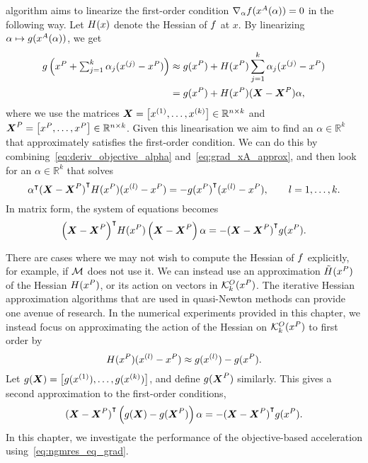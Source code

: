 \documentclass[main.tex]{subfiles}
\begin{document}
algorithm aims to linearize the first-order condition
$\nabla_\alpha f(x^A(\alpha))=0$ in the following way. Let
$H(x)$ denote the Hessian of $f$ at $x$. By linearizing
$\alpha\mapsto\nobreak g(x^A(\alpha))$, we get
\begin{align}\label{eq:grad_xA_approx}
  \begin{split}
    g\left({\textstyle
        x^P+\sum_{j=1}^k\alpha_j(x^{(j)}-x^P)}\right) &\approx
    g(x^P) + H(x^P)
    \sum_{j=1}^k\alpha_j(x^{(j)}-x^P)\\
    &= g(x^P) +H(x^P)(\boldsymbol{X}-\boldsymbol{X}^P)\alpha,
  \end{split}
\end{align}
where we use the matrices
$\boldsymbol{X} = \left[x^{(1)},\dots,x^{(k)}\right]\in\mathbb{R}^{n\times
  k}$ and
$\boldsymbol{X}^P = \left[x^P,\dots,x^P\right]\in\mathbb{R}^{n\times k}$.
Given this linearisation we aim to find an $\alpha\in\mathbb{R}^k$
that approximately satisfies the first-order
condition. %
We can do this by combining~\eqref{eq:deriv_objective_alpha}
and~\eqref{eq:grad_xA_approx}, and then look for an
$\alpha\in\mathbb{R}^k$ that solves
\begin{equation}
  \alpha^\intercal{(\boldsymbol{X}-\boldsymbol{X}^P)}^\intercal H(x^P)
  (x^{(l)}-x^P) = -{g(x^P)}^\intercal(x^{(l)}-x^P),\qquad l=1,\dots,k.
\end{equation}
In matrix form, the system of equations becomes
\begin{equation}\label{eq:ngmres_eq_hess}
  {\left(\boldsymbol{X}-\boldsymbol{X}^P\right)}^\intercal H(x^P)
  \left(\boldsymbol{X}-\boldsymbol{X}^P\right)
  \alpha
  = -{(\boldsymbol{X}-\boldsymbol{X}^P)}^\intercal{g(x^P)}.
\end{equation}

There are cases where we may not wish to compute the Hessian of $f$
explicitly, for example, if $\mathcal{M}$ does not use it.  We can instead
use an approximation $\tilde{H}(x^P)$ of the Hessian
$H(x^P)$, or its action on vectors in $\mathcal{K}_{k}^O(x^P)$.  The
iterative Hessian approximation algorithms that are used in
quasi-Newton methods can provide one avenue of research.  In the
numerical experiments provided in this chapter, we instead focus on
approximating the action of the Hessian on $\mathcal{K}_{k}^O(x^P)$ to first
order by
\begin{equation}\label{eq:approx_hess}
  H(x^P) (x^{(l)}-x^P)
  \approx g(x^{(l)})-g(x^P).
\end{equation}
Let
$g(\boldsymbol{X}) = \left[g(x^{(1)}),\dots,g(x^{(k)})\right]$,
and define $g(\boldsymbol{X}^P)$ similarly.  This gives a second
approximation to the first-order conditions,
\begin{equation}\label{eq:ngmres_eq_grad}
  {(\boldsymbol{X}-\boldsymbol{X}^P)}^\intercal\left(
    g(\boldsymbol{X})-g(\boldsymbol{X}^P)
  \right)
  \alpha
  = -{(\boldsymbol{X}-\boldsymbol{X}^P)}^\intercal{g(x^P)}.
\end{equation}
In this chapter, we investigate the performance of the
objective-based acceleration using~\eqref{eq:ngmres_eq_grad}.
\end{document}
